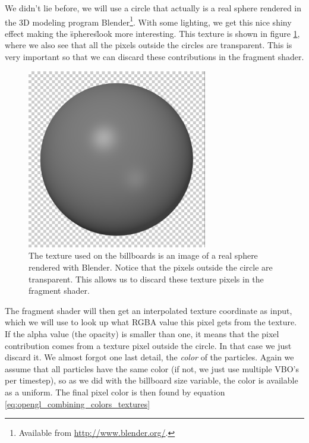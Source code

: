 We didn't lie before, we will use a circle that actually is a real sphere rendered in the 3D modeling program Blender\footnote{Available from \url{http://www.blender.org/}.}. With some lighting, we get this nice shiny effect making the \"spheres\" look more interesting. This texture is shown in figure \ref{fig:visualization_billboard_texture}, where we also see that all the pixels outside the circles are transparent. This is very important so that we can discard these contributions in the fragment shader.
\begin{figure}[h]
\begin{center}
\includegraphics[width=0.7\textwidth, trim=0cm 0cm 0cm 0cm, clip]{visualization/figures/texture_transparent.png}
\end{center}
\caption{The texture used on the billboards is an image of a real sphere rendered with Blender. Notice that the pixels outside the circle are transparent. This allows us to discard these texture pixels in the fragment shader.}
\label{fig:visualization_billboard_texture}
\end{figure}
The fragment shader will then get an interpolated texture coordinate as input, which we will use to look up what RGBA value this pixel gets from the texture. If the alpha value (the opacity) is smaller than one, it means that the pixel contribution comes from a texture pixel outside the circle. In that case we just discard it. We almost forgot one last detail, the \textit{color} of the particles. Again we assume that all particles have the same color (if not, we just use multiple VBO's per timestep), so as we did with the billboard size variable, the color is available as a uniform. The final pixel color is then found by equation \eqref{eq:opengl_combining_colors_textures}
